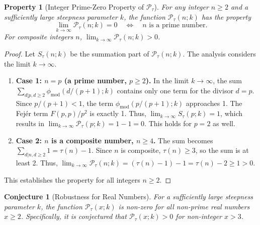 \documentclass[11pt,a4paper]{amsart}
\newcommand{\Px}{\mathcal{P}}
\theoremstyle{plain}
\newtheorem{conjecture}[theorem]{Conjecture}
\newtheorem{property}[theorem]{Property}
\theoremstyle{definition}
\begin{document}
\begin{property}[Integer Prime-Zero Property of $\Px_{\tau}$]\label{prop:integerprimezero}
For any integer $n \ge 2$ and a sufficiently large steepness parameter $k$, the function $\Px_{\tau}(n; k)$ has the property
\[
\lim_{k\to\infty} \Px_{\tau}(n; k) = 0 \quad\Longleftrightarrow\quad n \text{ is a prime number}.
\]
For composite integers $n$, $\lim_{k\to\infty} \Px_{\tau}(n; k) > 0$.
\end{property}
\begin{proof}
Let $S_{\tau}(n;k)$ be the summation part of $\Px_{\tau}(n;k)$.
The analysis considers the limit $k\to\infty$.
\begin{enumerate}
    \item \textbf{Case 1: $n = p$ (a prime number, $p \ge 2$).}
    In the limit $k\to\infty$, the sum $\sum_{d|p, d\ge2} \phi_{\text{mod}}(d/(p+1);k)$ contains only one term for the divisor $d=p$.
    Since $p/(p+1) < 1$, the term $\phi_{\text{mod}}(p/(p+1);k)$ approaches 1. The Fejér term $F(p,p)/p^2$ is exactly 1. Thus, $\lim_{k\to\infty} S_{\tau}(p;k) = 1$, which results in $\lim_{k\to\infty} \Px_{\tau}(p;k) = 1-1 = 0$.
    This holds for $p=2$ as well.
    \item \textbf{Case 2: $n$ is a composite number, $n \ge 4$.}
    The sum becomes $\sum_{d|n, d\ge2} 1 = \tau(n)-1$.
    Since $n$ is composite, $\tau(n)\ge3$, so the sum is at least 2. Thus, $\lim_{k\to\infty} \Px_{\tau}(n;k) = (\tau(n)-1)-1 = \tau(n)-2 \ge 1 > 0$.
\end{enumerate}
This establishes the property for all integers $n \ge 2$.
\end{proof}

\begin{conjecture}[Robustness for Real Numbers]\label{conj:Ptau_real}
For a sufficiently large steepness parameter $k$, the function $\Px_{\tau}(x; k)$ is non-zero for all non-prime real numbers $x \ge 2$.
Specifically, it is conjectured that $\Px_{\tau}(x; k) > 0$ for non-integer $x > 3$.
\end{conjecture}
\end{document}
